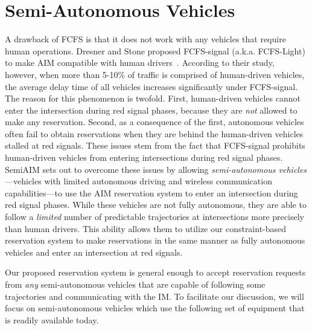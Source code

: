 \section{Semi-Autonomous Vehicles}
\label{sec:vehicles}

A drawback of FCFS is that it does not work with any vehicles that
require human operations.  Dresner and Stone proposed FCFS-signal
(a.k.a. FCFS-Light) to make AIM compatible with human
drivers~\cite{bib:Dresner07Sharing}.  According to their study,
however, when more than 5-10\% of traffic is comprised of human-driven
vehicles, the average delay time of all vehicles increases
significantly under FCFS-signal.  The reason for this phenomenon is
twofold.  First, human-driven vehicles cannot enter the intersection
during red signal phases, because they are \emph{not} allowed to make
any reservation.  Second, as a consequence of the first, autonomous
vehicles often fail to obtain reservations when they are behind the
human-driven vehicles stalled at red signals. These issues stem from
the fact that FCFS-signal prohibits human-driven vehicles from entering
intersections during red signal phases. SemiAIM sets out to overcome
these issues by allowing \emph{semi-autonomous vehicles}---vehicles
with limited autonomous driving and wireless communication
capabilities---to use the AIM reservation system to enter an
intersection during red signal phases.  While these vehicles are not
fully autonomous, they are able to follow a \emph{limited} number of
predictable trajectories at intersections more precisely than human
drivers.  This ability allows them to utilize our constraint-based
reservation system to make reservations in the same manner as fully
autonomous vehicles and enter an intersection at red signals.

Our proposed reservation system is general enough to accept
reservation requests from \emph{any} semi-autonomous vehicles that are
capable of following some trajectories and communicating with the IM.
To facilitate our discussion, we will focus on semi-autonomous
vehicles which use the following set of equipment that is readily
available today.

